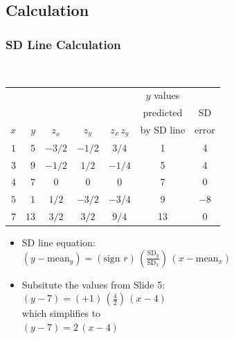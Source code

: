 \documentclass[t]{beamer}
\begin{document}
\subsection{Calculation}
\begin{frame}
\frametitle{SD Line Calculation}
\newcommand{\Z}{\hphantom{0}}
\newcommand{\VP}{\vphantom{\Large Y}}
\newcommand{\M}{\hphantom{$-$}}
{\ }\vspace{-28pt}

{\scriptsize
\begin{center}
\begin{tabular}{|rr|ccc||cc|}\hline
    &     &       &       &           & $y$ values   & \VP\\
    &     &       &       &           &  predicted  & SD\\
$x$ & $y$ & $z_x$ & $z_y$ & $z_x\,z_y$ & by SD line  & error\\[2pt]\hline
$1$   & $5$   & $-3/2$\M  & $-1/2$\M  & $3/4$       &  1  & 4\VP\\
$3$   & $9$   & $-1/2$\M  & $1/2$   & $-1/4$\M      &  5  & 4\\
$4$   & $7$   & $0$     & $0$     & $0$         &  7  & 0\\
$5$   & $1$   & $1/2$   & $-3/2$\M  & $-3/4$\M      &  9  & $-8$\M\\
$7$   & $13$  & $3/2$   & $3/2$   & $9/4$       &  13 & 0\\ \hline
\end{tabular}\vspace{-10pt}
\end{center}

\begin{itemize}
\item SD line equation:\\
$\displaystyle \left(y - \mbox{mean}_y\right) = \left(\mbox{sign $r$}\right)\,
   \left(\frac{\mbox{SD}_y}{\mbox{SD}_x}\right)\,\left(x - \mbox{mean}_x\right)$
\item Subsitute the values from Slide 5:\\[3pt]
$\displaystyle\left(y - 7\right) = (+1)\,
   \left(\frac{4}{2}\right)\,\left(x - 4\right)$\\[5pt]
which simplifies to\\[2pt]
{\color{blue}$(y-7) = 2\,(x-4)$}
\end{itemize}
}


\end{frame}
\end{document}
